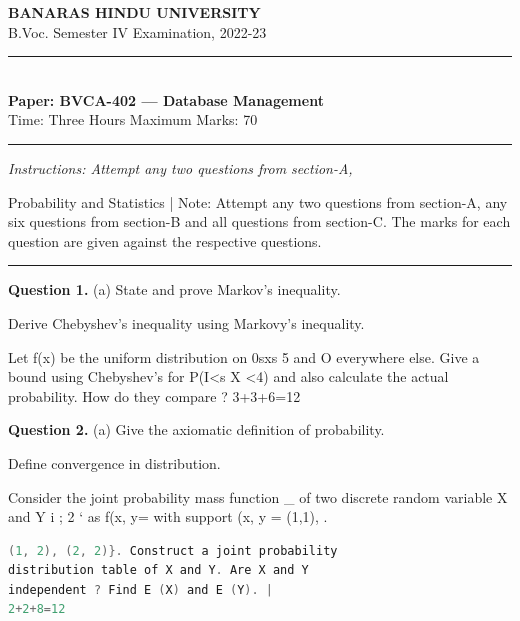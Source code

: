 \documentclass[11pt,a4paper]{article}
\begin{document}
\begin{center}
  {\large\bfseries BANARAS HINDU UNIVERSITY}\\[2pt]
  {\normalsize B.Voc. Semester IV Examination, 2022-23}\\[6pt]
  \rule{0.8\linewidth}{0.5pt}\\[6pt]
  {\large\bfseries Paper: BVCA-402 --- Database Management}\\[4pt]
  {\normalsize Time: Three Hours \hfill Maximum Marks: 70}
\end{center}

\rule{\linewidth}{0.4pt}

\smallskip
\noindent\textit{Instructions: Attempt any two questions from section-A,}

\bigskip

Probability and Statistics
| Note: Attempt any two questions from section-A,
any six questions from section-B and all
questions from section-C. The marks for
each question are given against the
respective questions.

\bigskip{}
\rule{\linewidth}{0.4pt}\smallskip

\medskip\noindent\textbf{Question 1.} (a) State and prove Markov's inequality.
\begin{parts}
  \item Derive Chebyshev's inequality using
  Markovy's inequality.
  \item Let f(x) be the uniform distribution on
  0sxs 5 and O everywhere else. Give a
  bound using Chebyshev's for P(I<s X <4) and
  also calculate the actual probability. How
  do they compare ? 3+3+6=12
\end{parts}

\medskip\noindent\textbf{Question 2.} (a) Give the axiomatic definition of probability.
\begin{parts}
  \item Define convergence in distribution.
  \item Consider the joint probability mass function \_
  of two discrete random variable X and Y
  i ; 2 ‘
  as f(x, y= with support {(x, y} = (1,1), .
\begin{lstlisting}[language=C]
(1, 2), (2, 2)}. Construct a joint probability
distribution table of X and Y. Are X and Y
independent ? Find E (X) and E (Y). |
2+2+8=12
\end{lstlisting}
\end{parts}
\end{document}
